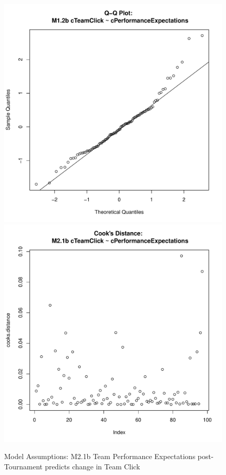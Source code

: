 \documentclass[12pt]{report}
\begin{document}
{\begin{figure}[htbp]
  \includegraphics[scale =.4]{../images/MLM21bQQNorm.pdf}
  \includegraphics[scale =.4]{../images/MLM21bCooksD.pdf}
  \caption{Model Assumptions: M2.1b Team Performance Expectations post-Tournament predicts change in Team Click}
  \label{fig:MLM21bAssumptions}
\end{figure}


}
\end{document}

